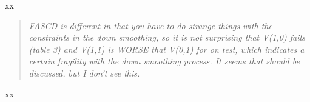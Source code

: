 \documentclass[letterpaper,final,12pt,reqno]{amsart}
\newenvironment{review}%
{\bigskip \par \begin{quote} \selectfont \sl}%
{\end{quote}}
\newcommand\short[1]{\medskip\noindent #1}   %
\begin{document}
\short{xx}

\begin{review}
FASCD is different in that you have to do strange things with the constraints in the down smoothing, so it is not surprising that V(1,0) fails (table 3) and V(1,1) is WORSE that V(0,1) for on test, which indicates a certain fragility with the down smoothing process. It seems that should be discussed, but I don't see this.
\end{review}

\short{xx}
\end{document}
